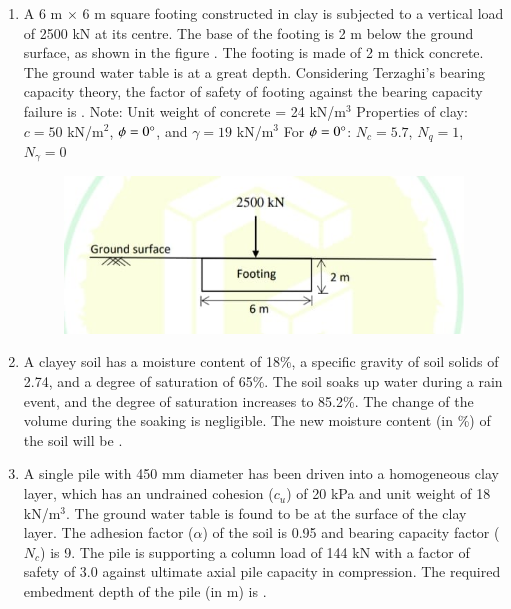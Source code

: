 \documentclass[journal,12pt,onecolumn]{article}
\theoremstyle{remark}
\begin{document}
\begin{enumerate}
\hfill{}

\item A 6 m $\times$ 6 m square footing constructed in clay is subjected to a vertical load of 2500 kN at its centre. The base of the footing is 2 m below the ground surface, as shown in the figure . The footing is made of 2 m thick concrete. The ground water table is at a great depth. Considering Terzaghi's bearing capacity theory, the factor of safety of footing against the bearing capacity failure is \underline{\hspace{2cm}} .
Note:
Unit weight of concrete = 24 kN/m$^3$
Properties of clay: $c = 50$ kN/m$^2$, $\phi = 0\degree$, and $\gamma = 19$ kN/m$^3$
For $\phi = 0\degree$: $N_c = 5.7$, $N_q = 1$, $N_\gamma = 0$
\begin{figure}[H]
    \centering
    \includegraphics[width=0.7\columnwidth]{figs/1q-56.jpg}
    \caption{}
    \label{fig:q56}
\end{figure}

\hfill{}

\item A clayey soil has a moisture content of 18\%, a specific gravity of soil solids of 2.74, and a degree of saturation of 65\%. The soil soaks up water during a rain event, and the degree of saturation increases to 85.2\%. The change of the volume during the soaking is negligible. The new moisture content (in \%) of the soil will be \underline{\hspace{2cm}} .

\hfill{}

\item A single pile with 450 mm diameter has been driven into a homogeneous clay layer, which has an undrained cohesion ($c_u$) of 20 kPa and unit weight of 18 kN/m$^3$. The ground water table is found to be at the surface of the clay layer. The adhesion factor ($\alpha$) of the soil is 0.95 and bearing capacity factor ($N_c$) is 9. The pile is supporting a column load of 144 kN with a factor of safety of 3.0 against ultimate axial pile capacity in compression.
The required embedment depth of the pile (in m) is \underline{\hspace{2cm}} .


\end{enumerate}
\end{document}
